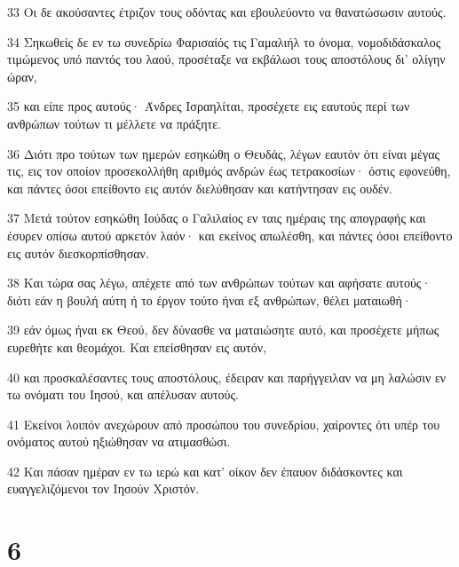 \par 33 Οι δε ακούσαντες έτριζον τους οδόντας και εβουλεύοντο να θανατώσωσιν αυτούς.
\par 34 Σηκωθείς δε εν τω συνεδρίω Φαρισαίός τις Γαμαλιήλ το όνομα, νομοδιδάσκαλος τιμώμενος υπό παντός του λαού, προσέταξε να εκβάλωσι τους αποστόλους δι' ολίγην ώραν,
\par 35 και είπε προς αυτούς· Άνδρες Ισραηλίται, προσέχετε εις εαυτούς περί των ανθρώπων τούτων τι μέλλετε να πράξητε.
\par 36 Διότι προ τούτων των ημερών εσηκώθη ο Θευδάς, λέγων εαυτόν ότι είναι μέγας τις, εις τον οποίον προσεκολλήθη αριθμός ανδρών έως τετρακοσίων· όστις εφονεύθη, και πάντες όσοι επείθοντο εις αυτόν διελύθησαν και κατήντησαν εις ουδέν.
\par 37 Μετά τούτον εσηκώθη Ιούδας ο Γαλιλαίος εν ταις ημέραις της απογραφής και έσυρεν οπίσω αυτού αρκετόν λαόν· και εκείνος απωλέσθη, και πάντες όσοι επείθοντο εις αυτόν διεσκορπίσθησαν.
\par 38 Και τώρα σας λέγω, απέχετε από των ανθρώπων τούτων και αφήσατε αυτούς· διότι εάν η βουλή αύτη ή το έργον τούτο ήναι εξ ανθρώπων, θέλει ματαιωθή·
\par 39 εάν όμως ήναι εκ Θεού, δεν δύνασθε να ματαιώσητε αυτό, και προσέχετε μήπως ευρεθήτε και θεομάχοι. Και επείσθησαν εις αυτόν,
\par 40 και προσκαλέσαντες τους αποστόλους, έδειραν και παρήγγειλαν να μη λαλώσιν εν τω ονόματι του Ιησού, και απέλυσαν αυτούς.
\par 41 Εκείνοι λοιπόν ανεχώρουν από προσώπου του συνεδρίου, χαίροντες ότι υπέρ του ονόματος αυτού ηξιώθησαν να ατιμασθώσι.
\par 42 Και πάσαν ημέραν εν τω ιερώ και κατ' οίκον δεν έπαυον διδάσκοντες και ευαγγελιζόμενοι τον Ιησούν Χριστόν.

\chapter{6}


